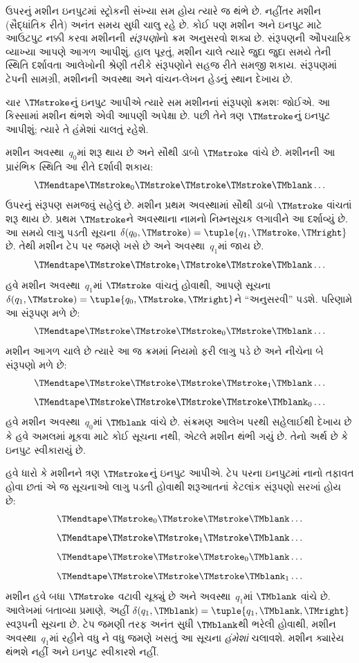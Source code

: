 \begin{explain}
ઉપરનું મશીન ઇનપુટમાં સ્ટ્રોકની સંખ્યા સમ હોય ત્યારે
જ થંભે છે. નહીંતર મશીન (સૈદ્ધાંતિક રીતે) અનંત સમય સુધી
ચાલુ રહે છે. કોઈ પણ મશીન અને ઇનપુટ માટે આઉટપુટ નક્કી
કરવા મશીનની \emph{સંરૂપણો}નો ક્રમ અનુસરવો શક્ય છે.
સંરૂપણની ઔપચારિક વ્યાખ્યા આપણે આગળ આપીશું. હાલ પૂરતું,
મશીન ચાલે ત્યારે જુદા જુદા સમયે તેની સ્થિતિ દર્શાવતા આલેખોની
શ્રેણી તરીકે સંરૂપણોને સહજ રીતે સમજી શકાય. સંરૂપણમાં ટેપની
સામગ્રી, મશીનની અવસ્થા અને વાંચન-લેખન હેડનું સ્થાન દેખાય છે.

ચાર $\TMstroke$નું ઇનપુટ આપીએ ત્યારે સમ મશીનનાં સંરૂપણો
ક્રમશઃ જોઈએ. આ કિસ્સામાં મશીન થંભશે એવી આપણી અપેક્ષા
છે. પછી તેને ત્રણ $\TMstroke$નું ઇનપુટ આપીશું; ત્યારે તે
હંમેશાં ચાલતું રહેશે.

મશીન અવસ્થા~$q_0$માં શરૂ થાય છે અને સૌથી ડાબો
$\TMstroke$ વાંચે છે. મશીનની આ પ્રારંભિક સ્થિતિ આ રીતે
દર્શાવી શકાય:
\[
\TMendtape \TMstroke_0 \TMstroke \TMstroke \TMstroke \TMblank \ldots
\]
ઉપરનું સંરૂપણ સમજવું સહેલું છે. મશીન પ્રથમ અવસ્થામાં
સૌથી ડાબો $\TMstroke$ વાંચતાં શરૂ થાય છે. પ્રથમ
$\TMstroke$ને અવસ્થાના નામનો નિમ્નસૂચક લગાવીને આ દર્શાવ્યું
છે. આ સમયે લાગુ પડતી સૂચના
$\delta(q_0, \TMstroke) = \tuple{q_1, \TMstroke, \TMright}$
છે. તેથી મશીન ટેપ પર જમણે ખસે છે અને અવસ્થા~$q_1$માં
જાય છે.
\[
\TMendtape \TMstroke \TMstroke_1 \TMstroke \TMstroke \TMblank \ldots
\]
હવે મશીન અવસ્થા~$q_1$માં $\TMstroke$ વાંચતું હોવાથી,
આપણે સૂચના $\delta(q_1, \TMstroke) = \tuple{q_0,
  \TMstroke, \TMright}$ને ``અનુસરવી'' પડશે. પરિણામે આ
સંરૂપણ મળે છે:
\[
\TMendtape \TMstroke \TMstroke \TMstroke_0 \TMstroke \TMblank \ldots
\]
મશીન આગળ ચાલે છે ત્યારે આ જ ક્રમમાં નિયમો ફરી લાગુ પડે
છે અને નીચેના બે સંરૂપણો મળે છે:
\[
\TMendtape \TMstroke \TMstroke \TMstroke \TMstroke_1 \TMblank \ldots
\]
\[
\TMendtape \TMstroke \TMstroke \TMstroke \TMstroke \TMblank_0 \ldots
\]
હવે મશીન અવસ્થા~$q_0$માં $\TMblank$ વાંચે છે. સંક્રમણ
આલેખ પરથી સહેલાઈથી દેખાય છે કે હવે અમલમાં મૂકવા માટે કોઈ
સૂચના નથી, એટલે મશીન થંભી ગયું છે. તેનો અર્થ છે કે
ઇનપુટ સ્વીકારાયું છે.

હવે ધારો કે મશીનને ત્રણ $\TMstroke$નું ઇનપુટ આપીએ.
ટેપ પરના ઇનપુટમાં નાનો તફાવત હોવા છતાં એ જ સૂચનાઓ લાગુ
પડતી હોવાથી શરૂઆતનાં કેટલાંક સંરૂપણો સરખાં હોય છે:
\[
\TMendtape \TMstroke_0 \TMstroke \TMstroke \TMblank \ldots
\]
\[
\TMendtape \TMstroke \TMstroke_1 \TMstroke \TMblank \ldots
\]
\[
\TMendtape \TMstroke \TMstroke \TMstroke_0 \TMblank \ldots
\]
\[
\TMendtape \TMstroke \TMstroke \TMstroke \TMblank_1 \ldots
\]
મશીન હવે બધા $\TMstroke$ વટાવી ચૂક્યું છે અને
અવસ્થા~$q_1$માં $\TMblank$ વાંચે છે. આલેખમાં બતાવ્યા
પ્રમાણે, અહીં $\delta(q_1, \TMblank) =\tuple{q_1,
\TMblank, \TMright}$ સ્વરૂપની સૂચના છે. ટેપ જમણી તરફ
અનંત સુધી $\TMblank$થી ભરેલી હોવાથી, મશીન
અવસ્થા~$q_1$માં રહીને વધુ ને વધુ જમણે ખસતું આ સૂચના
\emph{હંમેશાં} ચલાવશે. મશીન ક્યારેય થંભશે નહીં અને ઇનપુટ
સ્વીકારશે નહીં.
\end{explain}

